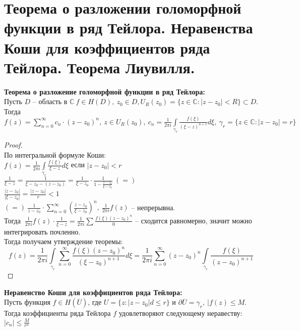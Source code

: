 \newpage
\section{Теорема о разложении голоморфной функции в ряд Тейлора. Неравенства Коши для коэффициентов ряда Тейлора. Теорема Лиувилля.}

\textbf{Теорема о разложение голоморфной функции в ряд Тейлора:}\\[2mm]
Пусть $D$ -- область в $\mathbb{C} \ f \in H(D), \ z_0 \in D, U_R(z_0) = \{z \in \mathbb{C}: |z-z_0| < R\} \subset D$. \\[2mm]
Тогда $f(z) = \sum_{n=0}^{\infty}c_n \cdot (z-z_0)^n, \ z \in U_R(z_0), \ c_n = \frac{1}{2\pi i} \int \limits_{{\gamma}_r} \frac{f(\xi)}{(\xi-z)^{n+1}} d\xi, \ \gamma_r = \{z \in \mathbb{C}: |z-z_0| = r\}$


\begin{proof}
	\ \\
	По интегральной формуле Коши: \\[2mm]
	$f(z) = \frac{1}{2 \pi i} \int \limits_{{\gamma}_r} \frac{f(\xi)}{\xi - z} d\xi$ если $|z-z_0| < r$\\[2mm]
	$\frac{1}{\xi - z} = \frac{1}{\xi - z_0 - (z - z_0)} = \frac{1}{\xi - z_0} \cdot \frac{1}{1 - \frac{z-z_0}{\xi - z_0}} \ (=)$\\[2mm]
	$\frac{|z-z_0|}{|\xi - z_0|} = \frac{|z - z_0|}{r} < 1$\\[2mm]
	$(=) \ \frac{1}{z-z_0} \cdot \sum_{n=0}^{\infty} \left( \frac {z-z_0}{\xi - z_0}\right)^n, \ \frac{1}{2 \pi i}f(z)$ -- непрерывна. \\[2mm]
	Тогда $ \ \frac{1}{2 \pi i}f(z) \cdot \frac{1}{\xi - z} = \frac{1}{2 \pi i} \sum \frac{f(\xi)(z-z_0)^n}{0}$ -- сходится равномерно, значит можно интегрировать почленно. \\[2mm]
	Тогда получаем утверждение теоремы:
	$$
	f(z) = \frac{1}{2 \pi i} \int \limits_{{\gamma}_r} \sum_{n=0}^{\infty}\frac{f(\xi) (z - z_0)^n}{(\xi - z_0)^{n+1}}d\xi = \frac{1}{2 \pi i}\sum_{n=0}^{\infty}(z-z_0)^n \int \limits_{{\gamma}_r} \frac{f(\xi)}{(z-z_0)^{n+1}}
	$$
\end{proof}


\textbf{Неравенство Коши для коэффициентов ряда Тейлора:}\\[2mm]
Пусть функция $f \in H(\overline{U})$, где $U = \{ z: |z-z_0|d \leq r\}$ и $\partial\overline{U} = {\gamma}_r, \ |f(z) \leq M$. \\[2mm]
Тогда коэффициенты ряда Тейлора $f$ удовлетворяют следующему неравеству: $|c_n| \leq \frac{M}{r^n}$ 


